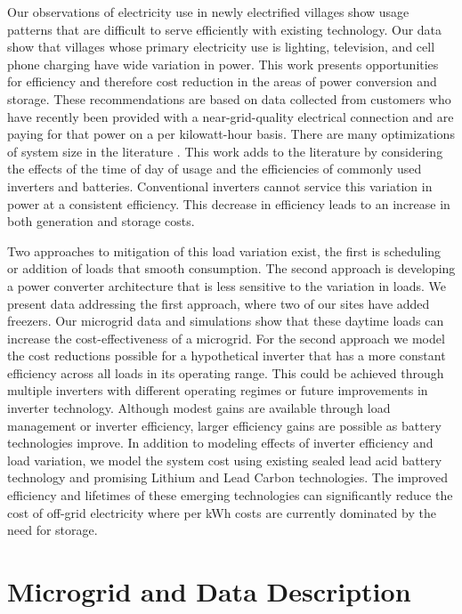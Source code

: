 \documentclass[conference]{IEEEtran}
\begin{document}
Our observations of electricity use in newly electrified villages
show usage patterns that are difficult to serve efficiently
with existing technology.
Our data show that villages whose primary electricity use is
lighting, television, and cell phone charging have wide variation
in power.
This work presents opportunities for efficiency and therefore
cost reduction in the areas of power conversion and storage.
These recommendations are based on data collected from customers
who have recently been provided with a near-grid-quality
electrical connection and are paying for that power on a
per kilowatt-hour basis.
There are many optimizations of system size in the literature
\cite{optimizations}.
This work adds to the literature by considering the effects
of the time of day of usage and the efficiencies of commonly
used inverters and batteries.
Conventional inverters cannot service this variation in power
at a consistent efficiency.
This decrease in efficiency leads to an increase in both
generation and storage costs.

Two approaches to mitigation of this load variation exist,
the first is scheduling or addition of loads that smooth consumption.
The second approach is developing a power converter architecture
that is less sensitive to the variation in loads.
We present data addressing the first approach, where two of our
sites have added freezers.
Our microgrid data and simulations show that these daytime loads
can increase the cost-effectiveness of a microgrid.
For the second approach we model the cost reductions possible
for a hypothetical inverter that has a more constant efficiency
across all loads in its operating range.
This could be achieved through multiple inverters with
different operating regimes or future improvements in inverter
technology.
Although modest gains are available through load management or
inverter efficiency, larger efficiency
gains are possible as battery technologies improve.
In addition to modeling effects of inverter efficiency and load
variation, we model the system cost using existing sealed lead acid
battery technology and promising Lithium and Lead Carbon
technologies.
The improved efficiency and lifetimes of these emerging technologies
can significantly reduce the cost of off-grid electricity
where per kWh costs are currently dominated by the need
for storage.


\section{Microgrid and Data Description}
\end{document}
